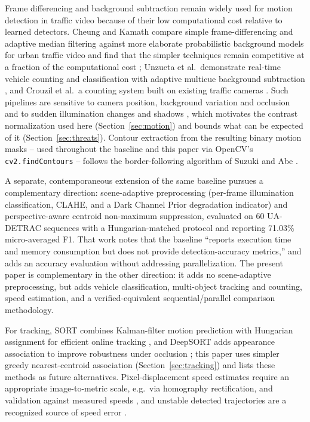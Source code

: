 \documentclass[conference]{IEEEtran}
\newcommand{\code}[1]{\texttt{#1}}
\begin{document}
Frame differencing and background subtraction remain widely used for
motion detection in traffic video because of their low computational
cost relative to learned detectors. Cheung and Kamath compare simple
frame-differencing and adaptive median filtering against more elaborate
probabilistic background models for urban traffic video and find that
the simpler techniques remain competitive at a fraction of the
computational cost \cite{cheung2004}; Unzueta et al.\ demonstrate
real-time vehicle counting and classification with adaptive multicue
background subtraction \cite{unzueta2012}, and Crouzil et al.\ a
counting system built on existing traffic cameras \cite{crouzil2016}.
Such pipelines are sensitive to camera position, background variation
and occlusion \cite{abbas2021} and to sudden illumination changes and
shadows \cite{chen2020}, which motivates the contrast normalization used
here (Section~\ref{sec:motion}) and bounds what can be expected of it
(Section~\ref{sec:threats}). Contour extraction from the resulting binary
motion masks -- used throughout the baseline and this paper via OpenCV's
\code{cv2.findContours} -- follows the border-following algorithm of
Suzuki and Abe \cite{suzuki1985}.

A separate, contemporaneous extension of the same baseline
\cite{muthuraja2026} pursues a complementary direction: scene-adaptive
preprocessing (per-frame illumination classification, CLAHE, and a Dark
Channel Prior degradation indicator) and perspective-aware centroid
non-maximum suppression, evaluated on 60 UA-DETRAC sequences with a
Hungarian-matched protocol and reporting 71.03\% micro-averaged F1. That
work notes that the baseline ``reports execution time and memory
consumption but does not provide detection-accuracy metrics,'' and adds
an accuracy evaluation without addressing parallelization. The present
paper is complementary in the other direction: it adds no scene-adaptive
preprocessing, but adds vehicle classification, multi-object tracking
and counting, speed estimation, and a verified-equivalent
sequential/parallel comparison methodology.

For tracking, SORT combines Kalman-filter motion prediction with
Hungarian assignment for efficient online tracking \cite{bewley2016}, and
DeepSORT adds appearance association to improve robustness under
occlusion \cite{wojke2017}; this paper uses simpler greedy
nearest-centroid association (Section~\ref{sec:tracking}) and lists
these methods as future alternatives. Pixel-displacement speed estimates
require an appropriate image-to-metric scale, e.g.\ via homography
rectification, and validation against measured speeds \cite{kamil2024},
and unstable detected trajectories are a recognized source of speed error
\cite{sangsuwan2024}.
\end{document}
